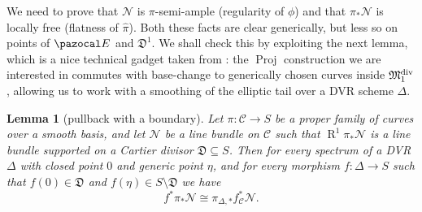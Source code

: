 \documentclass[11pt]{amsart}
\renewcommand{\to}{\rightarrow}
\newcommand{\cC}{\mathcal C}
\newcommand{\MM}{\mathfrak M}
\newcommand{\R}{\operatorname{R}}
\newcommand{\dvr}{\Delta}
\newcommand{\Proj}{\operatorname{Proj}}
\theoremstyle{plain}
\newtheorem{lem}[thm]{Lemma}
\theoremstyle{definition}
\begin{document}
We need to prove that $\mathcal N$ is $\pi$-semi-ample (regularity of $\phi$) and that $\pi_*\mathcal N$ is locally free (flatness of $\hat\pi$). Both these facts are clear generically, but less so on points of $\pazocal E$ and $\mathfrak D^1$. We shall check this by exploiting the next lemma, which is a nice technical gadget taken from \cite{RSPW}: the $\Proj$ construction we are interested in commutes with base-change to generically chosen curves inside $\MM_1^{\rm{div}}$, allowing us to work with a smoothing of the elliptic tail over a DVR scheme $\dvr$.

\begin{lem}[pullback with a boundary]\label{DVR}
Let $\pi\colon\cC\to S$ be a proper family of curves over a smooth basis, and let $\mathcal N$ be a line bundle on $\cC$ such that $\R^1\pi_*\mathcal N$ is a line bundle supported on a Cartier divisor $\mathfrak D\subseteq S$. Then for every spectrum of a DVR $\dvr$ with closed point $0$ and generic point $\eta$, and for every morphism $f\colon \dvr\to S$ such that $f(0)\in\mathfrak D$ and $f(\eta)\in S\setminus\mathfrak D$ we have
\[f^*\pi_*\mathcal N\cong \pi_{\dvr,*}f_\cC^*\mathcal N.\]
\end{lem}
\end{document}
